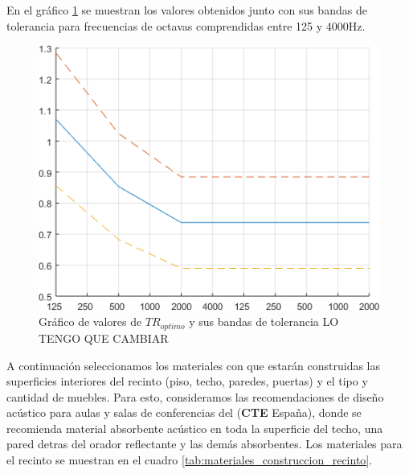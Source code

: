 \par En el gráfico \ref{fig:TR_optimosYtolerancia} se muestran los valores obtenidos junto con sus bandas de tolerancia para frecuencias de octavas comprendidas entre 125 y 4000Hz.


\begin{figure}[H]
	\centering
	\includegraphics[width=1\textwidth]{./img/TR_optimosYtolerancia.png}
	\caption{Gráfico de valores de $TR_{optimo}$ y sus bandas de tolerancia LO TENGO QUE CAMBIAR}
	\label{fig:TR_optimosYtolerancia}
\end{figure}

\par A continuación seleccionamos los materiales con que estarán construidas las superficies interiores del recinto (piso, techo, paredes, puertas) y el tipo y cantidad de muebles. Para esto, consideramos las recomendaciones de diseño acústico para aulas y salas de conferencias del  (\textbf{CTE} España), donde se recomienda material absorbente acústico en toda la superficie del techo, una pared detras del orador reflectante y las demás absorbentes. Los materiales para el recinto se muestran en el cuadro \ref{tab:materiales_construccion_recinto}.

